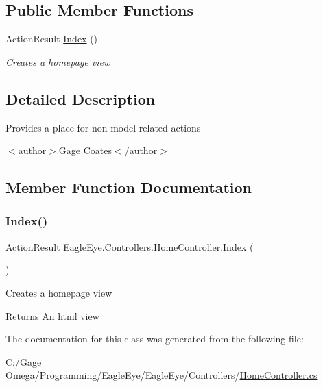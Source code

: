 \subsection*{Public Member Functions}
\begin{DoxyCompactItemize}
\item 
Action\+Result \mbox{\hyperlink{class_eagle_eye_1_1_controllers_1_1_home_controller_a514cfcd727b9415f4918ee62072b1259}{Index}} ()
\begin{DoxyCompactList}\small\item\em Creates a homepage view \end{DoxyCompactList}\end{DoxyCompactItemize}


\subsection{Detailed Description}
Provides a place for non-\/model related actions 

$<$author$>$Gage Coates$<$/author$>$ 

\subsection{Member Function Documentation}
\mbox{\label{class_eagle_eye_1_1_controllers_1_1_home_controller_a514cfcd727b9415f4918ee62072b1259}} 
\subsubsection{\texorpdfstring{Index()}{Index()}}
{\footnotesize\ttfamily Action\+Result Eagle\+Eye.\+Controllers.\+Home\+Controller.\+Index (\begin{DoxyParamCaption}{ }\end{DoxyParamCaption})}



Creates a homepage view 

\begin{DoxyReturn}{Returns}
An html view
\end{DoxyReturn}


The documentation for this class was generated from the following file\+:\begin{DoxyCompactItemize}
\item 
C\+:/\+Gage Omega/\+Programming/\+Eagle\+Eye/\+Eagle\+Eye/\+Controllers/\mbox{\hyperlink{_home_controller_8cs}{Home\+Controller.\+cs}}\end{DoxyCompactItemize}
